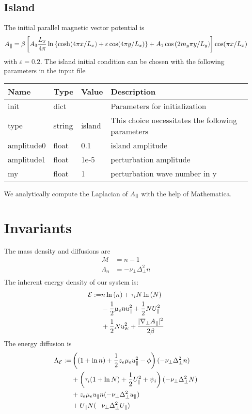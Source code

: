 \subsection{Island}
The initial parallel magnetic vector potential is
\begin{align}
    A_\parallel =\beta \left[ A_0\frac{L_x}{4\pi} \ln \left\{ \cosh( 4\pi x/L_x) + \varepsilon \cos( 4\pi y/L_x)\right\} + A_1\cos{(2m_y \pi y/L_y)}\right] \cos( \pi x /L_x)
\end{align}
with $\varepsilon = 0.2$.
The island initial condition can be chosen with the following parameters in the input file
\begin{longtable}{llll}
\toprule
\rowcolor{gray!50}\textbf{Name} &  \textbf{Type} & \textbf{Value}  & \textbf{Description}  \\ \midrule
init &  dict &   & Parameters for initialization \\
\qquad type      & string & island & This choice necessitates the following parameters \\
\qquad amplitude0  & float &  0.1     &  island amplitude \\
\qquad amplitude1  & float &  1e-5    &  perturbation amplitude \\
\qquad my          & float &  1       &  perturbation wave number in y\\
\bottomrule
\end{longtable}
We analytically compute the Laplacian of $A_\parallel$ with the help of Mathematica.

\section{Invariants}
The mass density and diffusions are
\begin{align}
    \mathcal M &= n-1 \\
     \Lambda_n &= -\nu_\perp \Delta_\perp^2 n  \\
\end{align}
The inherent energy density of our system is:
\begin{align}
 \mathcal{E} := &
                    n  \ln{(\ensuremath{n })}
                  + \tau_i N \ln{( \ensuremath{N})}
                  \nonumber \\
                 &- \frac{1}{2} \mu_e n  u_\parallel^2
                  + \frac{1}{2} N U_\parallel^2
                  \nonumber \\
                 &+\frac{1}{2} N u_E^2
                  + \frac{|\nabla_\perp A_\parallel|^2}{2 \beta}
\end{align}
The energy diffusion is
\begin{align}
    \Lambda_\mathcal{E} :=  &\left( (1+\ln n ) + \frac{1}{2} z_e \mu_e u_\parallel^2 - \phi \right) (-\nu_\perp \Delta_\perp^2 n )
    \nonumber\\
    &+ \left( \tau_i ( 1+\ln N) + \frac{1}{2} U_\parallel^2 + \psi_i\right)(-\nu_\perp \Delta_\perp^2 N)
    \nonumber\\
    &+ z_e\mu_e u_\parallel n  (-\nu_\perp \Delta_\perp^2 u_\parallel)
    \nonumber\\
    &+ U_\parallel N (-\nu_\perp \Delta_\perp^2 U_\parallel)
\end{align}

